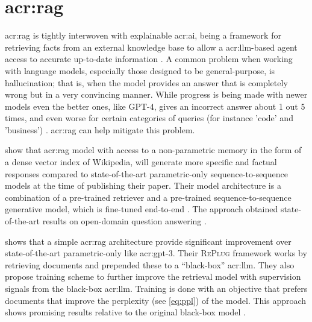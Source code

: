 \section[Retrieval Augmented Generation]{\acrlong{acr:rag}}\label{sec:retrieval-automented-generation}

\gls{acr:rag} is tightly interwoven with explainable \acrshort{acr:ai}, being a framework for retrieving facts from an external knowledge base to allow a \acrshort{acr:llm}-based agent access to accurate up-to-date information \citep{martineauWhatRetrievalaugmentedGeneration2023}. A common problem when working with language models, especially those designed to be general-purpose, is hallucination; that is, when the model provides an answer that is completely wrong but in a very convincing manner. While progress is being made with newer models even the better ones, like GPT-4, gives an incorrect answer about 1 out 5 times, and even worse for certain categories of queries (for instance 'code' and 'business') \citep[10]{openaiGPT4TechnicalReport2023}. \acrlong{acr:rag} can help mitigate this problem.

\cite{lewisRetrievalAugmentedGenerationKnowledgeIntensive2020} show that \gls{acr:rag} model with access to a non-parametric memory in the form of a dense vector index of Wikipedia, will generate more specific and factual responses compared to state-of-the-art parametric-only sequence-to-sequence models at the time of publishing their paper. Their model architecture is a combination of a pre-trained retriever and a pre-trained sequence-to-sequence generative model, which is fine-tuned end-to-end \citep[2]{lewisRetrievalAugmentedGenerationKnowledgeIntensive2020}. The approach obtained state-of-the-art results on open-domain question answering \citep[5-6]{lewisRetrievalAugmentedGenerationKnowledgeIntensive2020}.

\cite{shiREPLUGRetrievalAugmentedBlackBox2023} shows that a simple \gls{acr:rag} architecture provide significant improvement over state-of-the-art parametric-only  like \acrshort{acr:gpt}-3. Their \textsc{RePlug} framework works by retrieving documents and prepended these to a \enquote{black-box} \acrshort{acr:llm}. They also propose training scheme to further improve the retrieval model with supervision signals from the black-box \acrshort{acr:llm}. Training is done with an objective that prefers documents that improve the perplexity (see \eqref{eq:ppl}) of the model. This approach shows promising results relative to the original black-box model \citep[5-6]{shiREPLUGRetrievalAugmentedBlackBox2023}.

